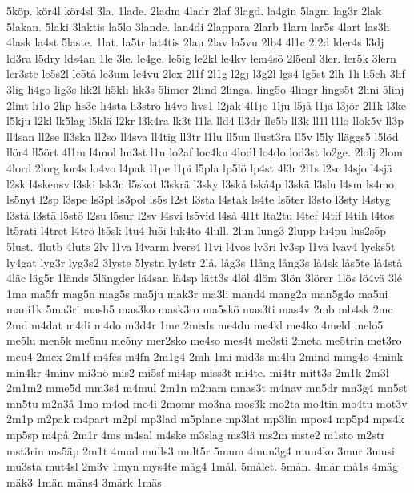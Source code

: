 {5k^^f6p.
k^^f6r4l
k^^f6r4sl
3la.
1lade.
2ladm
4ladr
2laf
3lagd.
la4gin
5lagm
lag3r
2lak
5lakan.
5laki
3laktis
la5lo
3lande.
lan4di
2lappara
2larb
1larn
lar5s
4lart
las3h
4lask
la4st
5laste.
1lat.
la5tr
lat4tis
2lau
2lav
la5vu
2lb4
4l1c
2l2d
lder4s
l3dj
ld3ra
l5dry
lds4an
1le
3le.
le4ge.
le5ig
le2kl
le4kv
lem4s^^f6
2l5enl
3ler.
ler5k
3lern
ler3ste
le5s2l
le5t^^e5
le3um
le4vu
2lex
2l1f
2l1g
l2gj
l3g2l
lgs4
lg5st
2lh
1li
li5ch
3lif
3lig
li4go
lig3s
lik2l
li5kli
lik3s
5limer
2lind
2linga.
ling5o
4lingr
lings5t
2lini
5linj
2lint
li1o
2lip
lis3c
li4sta
li3str^^f6
li4vo
livs1
l2jak
4l1jo
1lju
l5j^^e5
l1j^^e4
l3j^^f6r
2l1k
l3ke
l5kju
l2kl
lk5lag
l5kl^^e4
l2kr
l3k4ra
lk3t
l1la
lld4
ll3dr
lle5b
ll3k
ll1l
l1lo
llok5v
ll3p
ll4san
ll2se
ll3ska
ll2so
ll4sva
ll4tig
ll3tr
l1lu
ll5un
llust3ra
ll5v
l5ly
ll^^e4ggs5
l5l^^f6d
ll^^f6r4
ll5^^f6rt
4l1m
l4mol
lm3st
l1n
lo2af
loc4ku
4lodl
lo4do
lod3st
lo2ge.
2lolj
2lom
4lord
2lorg
lor4s
lo4vo
l4pak
l1pe
l1pi
l5pla
lp5l^^f6
lp4st
4l3r
2l1s
l2sc
l4sjo
l4sj^^e4
l2sk
l4skensv
l3ski
lsk3n
l5skot
l3skr^^e4
l3sky
l3sk^^e5
lsk^^e54p
l3sk^^e4
l3slu
l4sm
ls4mo
ls5nyt
l2sp
l3spe
ls3pl
ls3pol
ls5s
l2st
l3sta
l4stak
ls4te
ls5ter
l3sto
l3sty
l4styg
l3st^^e5
l3st^^e4
l5st^^f6
l2su
l5sur
l2sv
l4svi
ls5vid
l4s^^e5
4l1t
lta2tu
l4tef
l4tif
l4tih
l4tos
lt5rati
l4tret
l4tr^^f6
lt5sk
ltu4
lu5i
luk4to
4lull.
2lun
lung3
2lupp
lu4pu
lus2s5p
5lust.
4lutb
4luts
2lv
l1va
l4varm
lvers4
l1vi
l4vos
lv3ri
lv3sp
l1v^^e4
lv^^e4v4
lycks5t
ly4gat
lyg3r
lyg3s2
3lyste
5lystn
ly4str
2l^^e5.
l^^e5g3s
1l^^e5ng
l^^e5ng3s
l^^e54sk
l^^e5s5te
l^^e54st^^e5
4l^^e4c
l^^e4g5r
1l^^e4nds
5l^^e4ngder
l^^e44san
l^^e44sp
l^^e4tt3s
4l^^f6l
4l^^f6m
3l^^f6n
3l^^f6rer
1l^^f6s
l^^f64v^^e4
3l^^e9
1ma
ma5fr
mag5n
mag5s
ma5ju
mak3r
ma3li
mand4
mang2a
man5g4o
ma5ni
mani1k
5ma3ri
mash5
mas3ko
mask3ro
ma5sk^^f6
mas3ti
mas4v
2mb
mb4sk
2mc
2md
m4dat
m4di
m4do
m3d4r
1me
2meds
me4du
me4kl
me4ko
4meld
melo5
me5lu
men5k
me5nu
me5ny
mer2sko
me4so
mes4t
me3sti
2meta
me5trin
met3ro
meu4
2mex
2m1f
m4fes
m4fn
2m1g4
2mh
1mi
mid3s
mi4lu
2mind
ming4o
4mink
min4kr
4minv
mi3n^^f6
mis2
mi5sf
mi4sp
miss3t
mi4te.
mi4tr
mitt3s
2m1k
2m3l
2m1m2
mme5d
mm3s4
m4mul
2m1n
m2nam
mnas3t
m4nav
mn5dr
mn3g4
mn5st
mn5tu
m2n3^^e5
1mo
m4od
mo4i
2momr
mo3na
mos3k
mo2ta
mo4tin
mo4tu
mot3v
2m1p
m2pak
m4part
m2pl
mp3lad
m5plane
mp3lat
mp3lin
mpos4
mp5p4
mps4k
mp5sp
m4p^^e5
2m1r
4ms
m4sal
m4ske
m3slag
ms3l^^e4
ms2m
mste2
m1sto
m2str
mst3rin
ms5^^e4p
2m1t
4mud
mulls3
mult5r
5mum
4mun3g4
mun4ko
3mur
3musi
mu3sta
mut4sl
2m3v
1myn
mys4te
m^^e5g4
1m^^e5l.
5m^^e5let.
5m^^e5n.
4m^^e5r
m^^e51s
4m^^e4g
m^^e4k3
1m^^e4n
m^^e4ns4
3m^^e4rk
1m^^e4s
}
